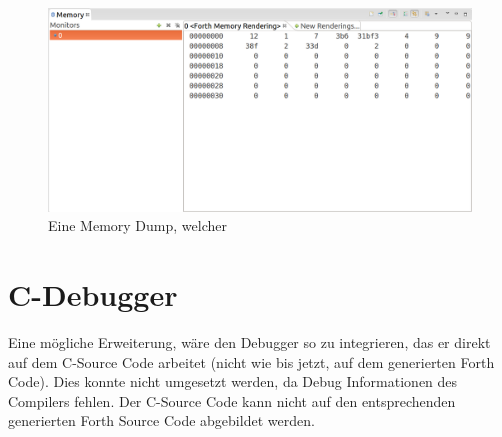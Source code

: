 \begin{figure}[H]
	\centering
		\includegraphics[scale=0.35]{debugger/dump.png}
		\caption{Eine Memory Dump, welcher}
		\label{fig:dump}
\end{figure}


\section{C-Debugger}

Eine mögliche Erweiterung, wäre den Debugger so zu integrieren, das er direkt auf dem C-Source Code arbeitet (nicht wie bis jetzt, auf dem generierten Forth Code). Dies konnte nicht umgesetzt werden, da Debug Informationen des Compilers fehlen. Der C-Source Code kann nicht auf den entsprechenden generierten Forth Source Code abgebildet werden.